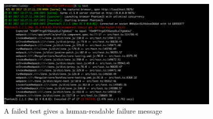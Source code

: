 \begin{figure}[H]
\begin{center}
\includegraphics[width=11cm]{figures/testing_failed_test}
\end{center}
\caption{A failed test gives a human-readable failure message}
\label{fig:testing_failed_test}
\end{figure}
